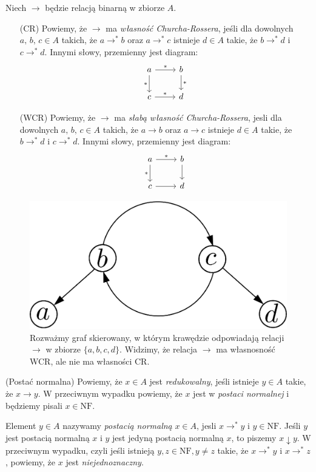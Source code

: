 \begin{definicja}
  Niech \(\to\) będzie relacją binarną w zbiorze \(A\). 
\begin{enumerate}
  \setlength\itemsep{0em}
  \item[(CR) ] Powiemy, że \(\to\) ma \emph{własność Churcha-Rossera}, jeśli
               dla dowolnych \(a,\,b,\,c\in A\) takich, że
               \(a\to^{*}b\) oraz \(a\to^{*} c\) istnieje \(d\in A\)
               takie, że \(b\to^{*} d\) i \(c\to^{*} d\).\label{def:cr_property_untyped}
               Innymi słowy, przemienny jest diagram:
               \[ \begin{tikzcd}
               a \arrow{r}{*} \arrow[swap]{d}{*} & b \arrow{d}{*} \\%
               c \arrow{r}{*}& d
               \end{tikzcd}
               \] 

  \item[(WCR)] Powiemy, że \(\to\) ma \emph{słabą własność 
               Churcha-Rossera}, jesli dla dowolnych \(a,\,b,\,c\in A\)
               takich, że \(a\to b\) oraz \(a\to c\) istnieje \(d\in A\) 
               takie, że \(b\to^{*} d\) i \(c\to^{*} d\).\label{def:wcr_property_untyped}
               Innymi słowy, przemienny jest diagram:
               \[ \begin{tikzcd}
               a \arrow{r}{*} \arrow[swap]{d}{*} & b \arrow{d}{} \\%
               c \arrow{r}{}& d
               \end{tikzcd}
               \] 

\end{enumerate}
\end{definicja}

\begin{figure}[!h]
  \centering
  \includegraphics[width=0.32\linewidth]{../wcrnotcr_example}
  \caption{Rozważmy graf skierowany, w którym krawędzie odpowiadają relacji \(\to\) w zbiorze \(\{a,b,c,d\}\). Widzimy, że relacja \(\to\) ma własnosność WCR, ale nie ma własności CR.}
\end{figure}

\begin{definicja}(Postać normalna)
  Powiemy, że \(x\in A\) jest \emph{redukowalny}, jeśli istnieje \(y\in A\) takie, że \(x\to y\). W przeciwnym wypadku powiemy, że \(x\) jest w \emph{postaci normalnej} i będziemy pisali \(x\in\mathrm{NF}\). 
  
  Element \(y\in A\) nazywamy \emph{postacią normalną} \(x\in A\), jesli \(x\to^{*}y\) i \(y\in\mathrm{NF}\). Jeśli \(y\) jest postacią normalną \(x\) i \(y\) jest jedyną postacią normalną \(x\), to piszemy \(x\downarrow y\). W przeciwnym wypadku, czyli jeśli istnieją \(y, z\in \mathrm{NF}, y\neq z\) takie, że \(x\to^{*} y\) i \(x\to^{*} z\), powiemy, że \(x\) jest \emph{niejednoznaczny}. 
\end{definicja}

